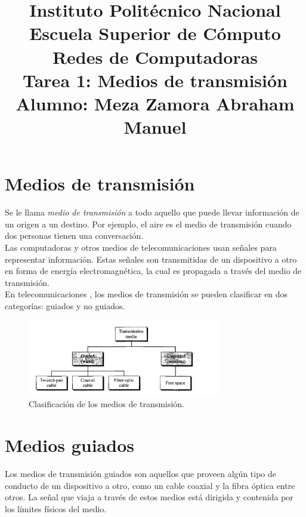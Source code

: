 \documentclass[a4paper,12pt]{article}
\begin{document}
\title{\Large Instituto Politécnico Nacional\\Escuela Superior de Cómputo\\Redes de Computadoras\\Tarea 1: Medios de transmisión\\Alumno: Meza Zamora Abraham Manuel}
\date{}
\maketitle

\section{Medios de transmisión}
Se le llama \textit{medio de transmisión} a todo aquello que puede llevar información de un origen a un destino. Por ejemplo, el aire es el medio de transmisión cuando dos personas tienen una conversación.\\
Las computadoras y otros medios de telecomunicaciones usan señales para representar información. Estas señales son transmitidas de un dispositivo a otro en forma de energía electromagnética, la cual es propagada a través del medio de transmisión.\\
En telecomunicaciones , los medios de transmisión se pueden clasificar en dos categorías: guiados y no guiados.

\begin{figure}[h]
\centering
\includegraphics[width=0.75\textwidth]{figuno}
\caption{Clasificación de los medios de transmisión.}
\label{ene}
\end{figure}

\section{Medios guiados}
Los medios de transmisión guiados son aquellos que proveen algún tipo de conducto de un dispositivo a otro, como un cable coaxial y la fibra óptica entre otros. La señal que viaja a través de estos medios está dirigida y contenida por los límites físicos del medio.
\end{document}
